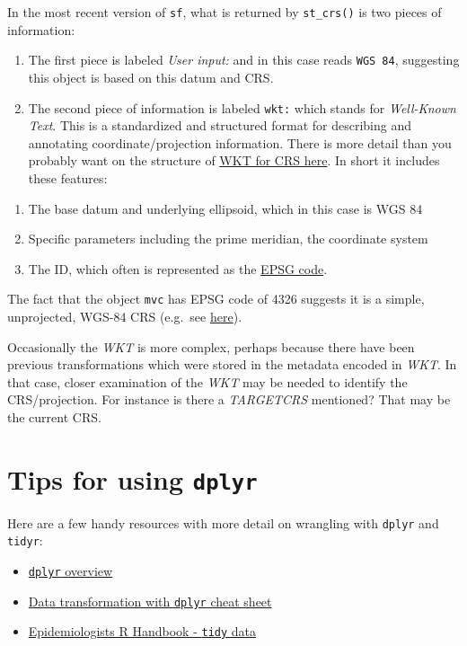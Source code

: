 \documentclass[
]{book}
\providecommand{\tightlist}{%
  \setlength{\itemsep}{0pt}\setlength{\parskip}{0pt}}
\begin{document}
In the most recent version of \texttt{sf}, what is returned by \texttt{st\_crs()} is two pieces of information:

\begin{enumerate}
\def\labelenumi{\arabic{enumi}.}
\tightlist
\item
  The first piece is labeled \emph{User input:} and in this case reads \texttt{WGS\ 84}, suggesting this object is based on this datum and CRS.
\item
  The second piece of information is labeled \texttt{wkt:} which stands for \emph{Well-Known Text}. This is a standardized and structured format for describing and annotating coordinate/projection information. There is more detail than you probably want on the structure of \href{http://docs.opengeospatial.org/is/12-063r5/12-063r5.html\#43}{WKT for CRS here}. In short it includes these features:
\end{enumerate}

\begin{enumerate}
\def\labelenumi{\alph{enumi}.}
\tightlist
\item
  The base datum and underlying ellipsoid, which in this case is WGS 84
\item
  Specific parameters including the prime meridian, the coordinate system
\item
  The ID, which often is represented as the \href{https://epsg.io/}{EPSG code}.
\end{enumerate}

The fact that the object \texttt{mvc} has EPSG code of 4326 suggests it is a simple, unprojected, WGS-84 CRS (e.g.~see \href{https://epsg.io/?q=4326}{here}).

Occasionally the \emph{WKT} is more complex, perhaps because there have been previous transformations which were stored in the metadata encoded in \emph{WKT}. In that case, closer examination of the \emph{WKT} may be needed to identify the CRS/projection. For instance is there a \emph{TARGETCRS} mentioned? That may be the current CRS.

\hypertarget{dplyr}{%
\chapter{\texorpdfstring{Tips for using \texttt{dplyr}}{Tips for using dplyr}}\label{dplyr}}

Here are a few handy resources with more detail on wrangling with \texttt{dplyr} and \texttt{tidyr}:

\begin{itemize}
\tightlist
\item
  \href{https://dplyr.tidyverse.org/}{\texttt{dplyr} overview}
\item
  \href{https://github.com/rstudio/cheatsheets/raw/master/data-transformation.pdf}{Data transformation with \texttt{dplyr} cheat sheet}
\item
  \href{https://epirhandbook.com/transition-to-r.html?q=tidy\#tidy-data}{Epidemiologists R Handbook - \texttt{tidy} data}
\end{itemize}
\end{document}
